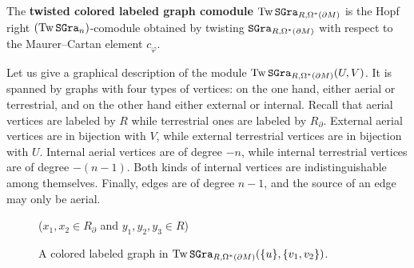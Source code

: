 \begin{definition}
  The \textbf{twisted colored labeled graph comodule} $\operatorname{Tw} \mathtt{SGra}_{R, \Omega^{*}(\partial M)}$ is the Hopf right $(\operatorname{Tw} \mathtt{SGra}_{n})$-comodule obtained by twisting $\mathtt{SGra}_{R, \Omega^{*}(\partial M)}$ with respect to the Maurer--Cartan element $c_{\varphi}$.
\end{definition}

Let us give a graphical description of the module $\operatorname{Tw} \mathtt{SGra}_{R, \Omega^{*}(\partial M)}(U,V)$.
It is spanned by graphs with four types of vertices: on the one hand, either aerial or terrestrial, and on the other hand either external or internal.
Recall that aerial vertices are labeled by $R$ while terrestrial ones are labeled by $R_{\partial}$.
External aerial vertices are in bijection with $V$, while external terrestrial vertices are in bijection with $U$.
Internal aerial vertices are of degree $-n$, while internal terrestrial vertices are of degree $-(n-1)$.
Both kinds of internal vertices are indistinguishable among themselves.
Finally, edges are of degree $n-1$, and the source of an edge may only be aerial.

\begin{figure}[htbp]
  \centering
  \quad ($x_{1}, x_{2} \in R_{\partial}$ and $y_{1}, y_{2}, y_{3} \in R$)
  \caption{A colored labeled graph in $\operatorname{Tw} \mathtt{SGra}_{R, \Omega^{*}(\partial M)}(\{u\}, \{v_1, v_2\})$.}
  \label{cnfbnd.fig.exa-col-lab-graph}
\end{figure}

